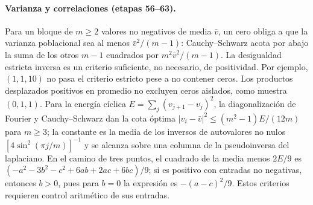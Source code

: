 \documentclass[11pt,a4paper]{article}
\newcommand{\B}[2]{#2}
\newcommand{\B}[2]{#1}
\begin{document}
\paragraph{\B{Variance and correlations (stages 56--63).}{Varianza y correlaciones (etapas 56--63).}}
\B{For a block of $m\ge2$ nonnegative values with mean $\bar v$, one zero forces population variance at least $\bar v^2/(m-1)$: Cauchy--Schwarz bounds the sum of the other $m-1$ squares below by $m^2\bar v^2/(m-1)$. The strict reverse inequality is a sufficient certificate, not a necessary condition for positivity. For example, $(1,1,10)$ fails the strict test despite containing no zero. Positive shifted products on average do not rule out isolated zeros, as the sequence $(0,1,1)$ already shows. For cyclic energy $E=\sum_j(v_{j+1}-v_j)^2$, Fourier diagonalization and Cauchy--Schwarz give the sharp bound $|v_i-\bar v|^2\le(m^2-1)E/(12m)$ for $m\ge3$; the constant is the mean of the nonzero inverse eigenvalues $[4\sin^2(\pi j/m)]^{-1}$, and equality is attained on a column of the Laplacian pseudoinverse. For the three-point path the squared-mean minus $2E/9$ reads $(-a^2-3b^2-c^2+6ab+2ac+6bc)/9$; if positive with nonnegative entries then $b>0$, since at $b=0$ the expression is $-(a-c)^2/9$. These tests need actual arithmetic control of the inputs.}{Para un bloque de $m\ge2$ valores no negativos de media $\bar v$, un cero obliga a que la varianza poblacional sea al menos $\bar v^2/(m-1)$: Cauchy--Schwarz acota por abajo la suma de los otros $m-1$ cuadrados por $m^2\bar v^2/(m-1)$. La desigualdad estricta inversa es un criterio suficiente, no necesario, de positividad. Por ejemplo, $(1,1,10)$ no pasa el criterio estricto pese a no contener ceros. Los productos desplazados positivos en promedio no excluyen ceros aislados, como muestra $(0,1,1)$. Para la energía cíclica $E=\sum_j(v_{j+1}-v_j)^2$, la diagonalización de Fourier y Cauchy--Schwarz dan la cota óptima $|v_i-\bar v|^2\le(m^2-1)E/(12m)$ para $m\ge3$; la constante es la media de los inversos de autovalores no nulos $[4\sin^2(\pi j/m)]^{-1}$ y se alcanza sobre una columna de la pseudoinversa del laplaciano. En el camino de tres puntos, el cuadrado de la media menos $2E/9$ es $(-a^2-3b^2-c^2+6ab+2ac+6bc)/9$; si es positivo con entradas no negativas, entonces $b>0$, pues para $b=0$ la expresión es $-(a-c)^2/9$. Estos criterios requieren control aritmético de sus entradas.}
\end{document}
